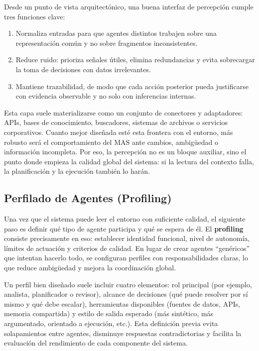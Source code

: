 \documentclass[12pt,a4paper]{article}
\begin{document}
Desde un punto de vista arquitectónico, una buena interfaz de percepción cumple tres funciones clave:

\begin{enumerate}
    \item Normaliza entradas para que agentes distintos trabajen sobre una representación común y no sobre fragmentos inconsistentes.
    \item Reduce ruido: prioriza señales útiles, elimina redundancias y evita sobrecargar la toma de decisiones con datos irrelevantes.
    \item Mantiene trazabilidad, de modo que cada acción posterior pueda justificarse con evidencia observable y no solo con inferencias internas.
\end{enumerate}

Esta capa suele materializarse como un conjunto de conectores y adaptadores: APIs, bases de conocimiento, buscadores, sistemas de archivos o servicios corporativos. Cuanto mejor diseñada esté esta frontera con el entorno, más robusto será el comportamiento del MAS ante cambios, ambigüedad o información incompleta. Por eso, la percepción no es un bloque auxiliar, sino el punto donde empieza la calidad global del sistema: si la lectura del contexto falla, la planificación y la ejecución también lo harán.
\subsection{Perfilado de Agentes (Profiling)}
Una vez que el sistema puede leer el entorno con suficiente calidad, el siguiente paso es definir qué tipo de agente participa y qué se espera de él. El \textbf{profiling} consiste precisamente en eso: establecer identidad funcional, nivel de autonomía, límites de actuación y criterios de calidad. En lugar de crear agentes ``genéricos'' que intentan hacerlo todo, se configuran perfiles con responsabilidades claras, lo que reduce ambigüedad y mejora la coordinación global.

Un perfil bien diseñado suele incluir cuatro elementos: rol principal (por ejemplo, analista, planificador o revisor), alcance de decisiones (qué puede resolver por sí mismo y qué debe escalar), herramientas disponibles (fuentes de datos, APIs, memoria compartida) y estilo de salida esperado (más sintético, más argumentado, orientado a ejecución, etc.). Esta definición previa evita solapamientos entre agentes, disminuye respuestas contradictorias y facilita la evaluación del rendimiento de cada componente del sistema.
\end{document}
